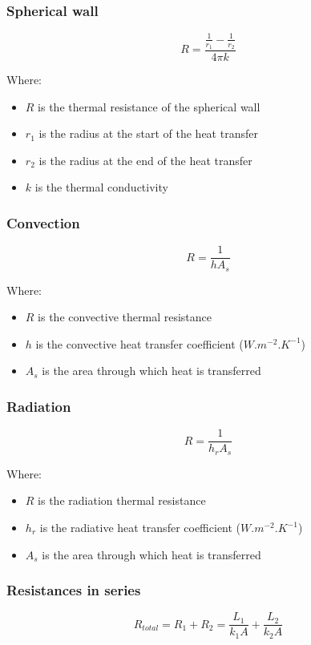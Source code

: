 \documentclass[11pt]{article}
\begin{document}
\subsubsection{Spherical wall}
\label{sec:orga646da3}
\[R = \frac{\frac{1}{r_1} - \frac{1}{r_2}}{4 \pi k}\]

Where:
\begin{itemize}
\item \(R\) is the thermal resistance of the spherical wall
\item \(r_1\) is the radius at the start of the heat transfer
\item \(r_2\) is the radius at the end of the heat transfer
\item \(k\) is the thermal conductivity
\end{itemize}

\subsubsection{Convection}
\label{sec:orgd7c0cfd}
\[R = \frac{1}{hA_s}\]

Where:
\begin{itemize}
\item \(R\) is the convective thermal resistance
\item \(h\) is the convective heat transfer coefficient (\(\unit{W.m^{-2}.K^{-1}}\))
\item \(A_s\) is the area through which heat is transferred
\end{itemize}

\subsubsection{Radiation}
\label{sec:org06d57b8}
\[R = \frac{1}{h_r A_s}\]

Where:
\begin{itemize}
\item \(R\) is the radiation thermal resistance
\item \(h_r\) is the radiative heat transfer coefficient (\(\unit{W.m^{-2}.K^{-1}}\))
\item \(A_s\) is the area through which heat is transferred
\end{itemize}

\subsubsection{Resistances in series}
\label{sec:org6811b94}
\[R_{total} = R_1 + R_2 = \frac{L_1}{k_1 A} + \frac{L_2}{k_2 A}\]
\end{document}
